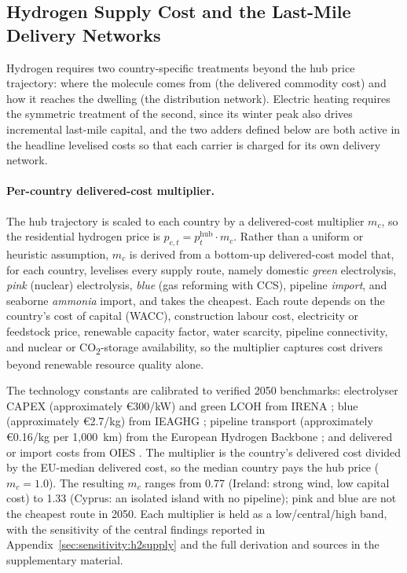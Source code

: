 \subsection{Hydrogen Supply Cost and the Last-Mile Delivery Networks}
\label{sec:method:h2}

Hydrogen requires two country-specific treatments beyond the hub price trajectory:
where the molecule comes from (the delivered commodity cost) and how it reaches the
dwelling (the distribution network). Electric heating requires the symmetric
treatment of the second, since its winter peak also drives incremental last-mile
capital, and the two adders defined below are both active in the headline levelised
costs so that each carrier is charged for its own delivery network.

\paragraph{Per-country delivered-cost multiplier.} The hub trajectory is scaled to each
country by a delivered-cost multiplier $m_c$, so the residential hydrogen price is
$p_{c,t} = p^{\mathrm{hub}}_t \cdot m_c$. Rather than a uniform or heuristic assumption,
$m_c$ is derived from a bottom-up delivered-cost model that, for each country, levelises
every supply route, namely domestic \emph{green} electrolysis, \emph{pink} (nuclear)
electrolysis, \emph{blue} (gas reforming with CCS), pipeline \emph{import}, and seaborne
\emph{ammonia} import, and takes the cheapest. Each route depends on the country's cost
of capital (WACC), construction labour cost, electricity or feedstock price, renewable
capacity factor, water scarcity, pipeline connectivity, and nuclear or
CO\textsubscript{2}-storage availability, so the multiplier captures cost drivers beyond
renewable resource quality alone.

The technology constants are calibrated to verified 2050 benchmarks: electrolyser CAPEX
(approximately \euro{}300/kW) and green LCOH from IRENA \citep{IRENA2022trade}; blue
(approximately \euro{}2.7/kg) from IEAGHG \citep{IEAGHG2022blue}; pipeline transport
(approximately \euro{}0.16/kg per 1{,}000~km) from the European Hydrogen Backbone
\citep{EHB2023countries}; and delivered or import costs from OIES
\citep{Alsulaiman2023ET24,OIES2024hydrogenimportsET32}. The multiplier is the country's
delivered cost divided by the EU-median delivered cost, so the median country pays the
hub price ($m_c=1.0$). The resulting $m_c$ ranges from 0.77 (Ireland: strong wind, low
capital cost) to 1.33 (Cyprus: an isolated island with no pipeline); pink and blue are
not the cheapest route in 2050. Each multiplier is held as a low/central/high band,
with the sensitivity of the central findings reported in
Appendix~\ref{sec:sensitivity:h2supply} and the full derivation and sources in the
supplementary material.

